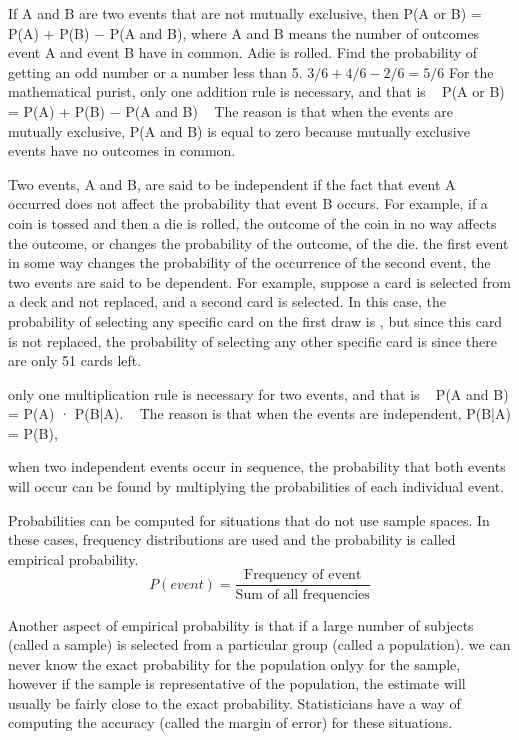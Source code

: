 If A and B are two events that are not mutually exclusive, then P(A or B) = P(A) + P(B) − P(A and B), where A and B means the number of outcomes event A and event B have in common. Adie is rolled. Find the probability of getting an odd number or a number less than 5. $3/6 + 4/6 - 2/6 = 5/6$
For the mathematical purist, only one addition rule is necessary, and that is   P(A or B) = P(A) + P(B) − P(A and B)   The reason is that when the events are mutually exclusive, P(A and B) is equal to zero because mutually exclusive events have no outcomes in common.

Two events, A and B, are said to be independent if the fact that event A occurred does not affect the probability that event B occurs. For example, if a coin is tossed and then a die is rolled, the outcome of the coin in no way affects the outcome, or changes the probability of the outcome, of the die. the first event in some way changes the probability of the occurrence of the second event, the two events are said to be dependent. For example, suppose a card is selected from a deck and not replaced, and a second card is selected. In this case, the probability of selecting any specific card on the first draw is , but since this card is not replaced, the probability of selecting any other specific card is since there are only 51 cards left.

only one multiplication rule is necessary for two events, and that is   P(A and B) = P(A) · P(B|A).   The reason is that when the events are independent, P(B|A) = P(B),

when two independent events occur in sequence, the probability that both events will occur can be found by multiplying the probabilities of each individual event.


Probabilities can be computed for situations that do not use sample spaces. In these cases, frequency distributions are used and the probability is called empirical probability.
\begin{equation}\label{prob:frequency-event}
P(event) = \frac{\text{Frequency of event}}{\text{Sum of all frequencies}}
\end{equation}

Another aspect of empirical probability is that if a large number of subjects (called a sample) is selected from a particular group (called a population). we can never know the exact probability for the population onlyy for the sample, however if the sample is representative of the population, the estimate will usually be fairly close to the exact probability. Statisticians have a way of computing the accuracy (called the margin of error) for these situations.




